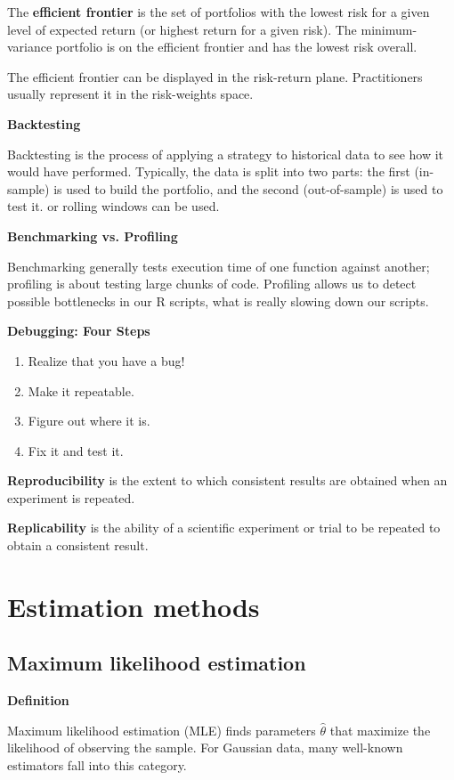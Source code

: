 \documentclass[12pt,a4paper]{article}
\begin{document}
The \textbf{efficient frontier} is the set of portfolios with the lowest risk for a given level of expected return (or highest return for a given risk). The minimum-variance portfolio is on the efficient frontier and has the lowest risk overall.


The efficient frontier can be displayed in the risk-return plane. Practitioners usually represent it in the risk-weights space.

\textbf{Backtesting}

Backtesting is the process of applying a strategy to historical data to see how it would have performed. Typically, the data is split into two parts: the first (in-sample) is used to build the portfolio, and the second (out-of-sample) is used to test it. or rolling windows can be used.

\textbf{Benchmarking vs. Profiling}

Benchmarking generally tests execution time of one function against another; profiling is about testing large chunks of code. Profiling allows us to detect possible bottlenecks in our R scripts, what is really slowing down our scripts.

\textbf{Debugging: Four Steps}

\begin{enumerate}
  \item Realize that you have a bug!
  \item Make it repeatable.
  \item Figure out where it is.
  \item Fix it and test it.
\end{enumerate}

\textbf{Reproducibility} is the extent to which consistent results are obtained when an experiment is repeated.

\textbf{Replicability} is the ability of a scientific experiment or trial to be repeated to obtain a consistent result.

\section{Estimation methods}

\subsection{Maximum likelihood estimation}

\textbf{Definition}

Maximum likelihood estimation (MLE) finds parameters $\hat{\theta}$ that maximize the likelihood of observing the sample. For Gaussian data, many well-known estimators fall into this category.
\end{document}
